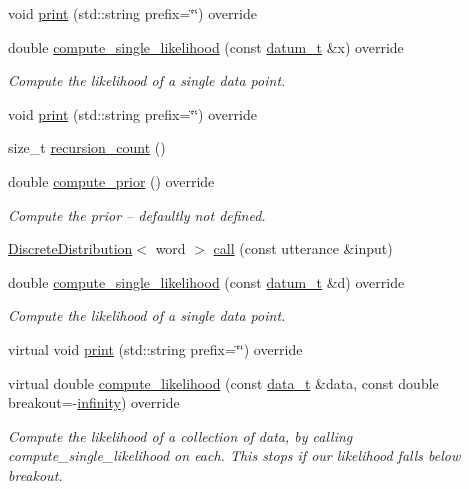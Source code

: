 \begin{DoxyCompactItemize}
void \hyperlink{class_my_hypothesis_a91fd22a2724e04c0e7c67ea4282beac4}{print} (std\+::string prefix=\char`\"{}\char`\"{}) override
\item 
double \hyperlink{class_my_hypothesis_af23a45a03a28ea4f42438e70d47acacb}{compute\+\_\+single\+\_\+likelihood} (const \hyperlink{class_bayesable_a9f1a6c0cd7855550fa10b1a8f13a5867}{datum\+\_\+t} \&x) override
\begin{DoxyCompactList}\small\item\em Compute the likelihood of a single data point. \end{DoxyCompactList}\item 
void \hyperlink{class_my_hypothesis_a91fd22a2724e04c0e7c67ea4282beac4}{print} (std\+::string prefix=\char`\"{}\char`\"{}) override
\item 
size\+\_\+t \hyperlink{class_my_hypothesis_a536a607a2008f50fb1062fd540c60063}{recursion\+\_\+count} ()
\item 
double \hyperlink{class_my_hypothesis_a67477313b60b21158bbfaad35dc5d275}{compute\+\_\+prior} () override
\begin{DoxyCompactList}\small\item\em Compute the prior -- defaultly not defined. \end{DoxyCompactList}\item 
\hyperlink{class_discrete_distribution}{Discrete\+Distribution}$<$ word $>$ \hyperlink{class_my_hypothesis_a88c6c3c093e040601d7283abf09b6348}{call} (const utterance \&input)
\item 
double \hyperlink{class_my_hypothesis_a480fc9e50d0faa0f5226f56187fd2eec}{compute\+\_\+single\+\_\+likelihood} (const \hyperlink{class_bayesable_a9f1a6c0cd7855550fa10b1a8f13a5867}{datum\+\_\+t} \&d) override
\begin{DoxyCompactList}\small\item\em Compute the likelihood of a single data point. \end{DoxyCompactList}\item 
virtual void \hyperlink{class_my_hypothesis_a81fa991ffd2cabe6f71ec129ae26ca6c}{print} (std\+::string prefix=\char`\"{}\char`\"{}) override
\item 
virtual double \hyperlink{class_my_hypothesis_ad5cd40d67c9b6fb61311a5f4a08df426}{compute\+\_\+likelihood} (const \hyperlink{class_bayesable_aa2788c4d7718c0a824e1d28c4c98f921}{data\+\_\+t} \&data, const double breakout=-\/\hyperlink{_numerics_8h_a1bb1e42ae1b40cad6e99da0aab8a5576}{infinity}) override
\begin{DoxyCompactList}\small\item\em Compute the likelihood of a collection of data, by calling compute\+\_\+single\+\_\+likelihood on each. This stops if our likelihood falls below breakout. \end{DoxyCompactList}\item 

\end{DoxyCompactItemize}
